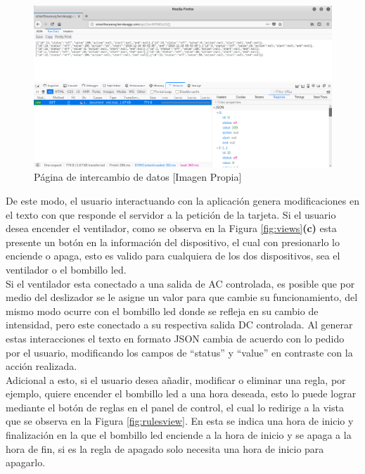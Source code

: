 \begin{figure}[H]
	\centering
	\caption{Página de intercambio de datos [Imagen Propia]}
	\label{fig:updateview}
	\includegraphics[width=1\linewidth]{Imagenes/Update_view}
\end{figure}

De este modo, el usuario interactuando con la aplicación genera modificaciones en el texto con que responde el servidor a la petición de la tarjeta. Si el usuario desea encender el ventilador, como se observa en la Figura \ref{fig:views}\textbf{(c)} esta presente un botón en la información del dispositivo, el cual con presionarlo lo enciende o apaga, esto es valido para cualquiera de los dos dispositivos, sea el ventilador o el bombillo led.\\

Si el ventilador esta conectado a una salida de AC controlada, es posible que por medio del deslizador se le asigne un valor para que cambie su funcionamiento, del mismo modo ocurre con el bombillo led donde se refleja en su cambio de intensidad, pero este conectado a su respectiva salida DC controlada. Al generar estas interacciones el texto en formato JSON cambia de acuerdo con lo pedido por el usuario, modificando los campos de ``status'' y ``value'' en contraste con la acción realizada.\\ 

Adicional a esto, si el usuario desea añadir, modificar o eliminar una regla, por ejemplo, quiere encender el bombillo led a una hora deseada, esto lo puede lograr mediante el botón de reglas en el panel de control, el cual lo redirige a la vista que se observa en la Figura \ref{fig:rulesview}. En esta se indica una hora de inicio y finalización en la que el bombillo led enciende a la hora de inicio y se apaga a la hora de fin, si es la regla de apagado solo necesita una hora de inicio para apagarlo.\\

